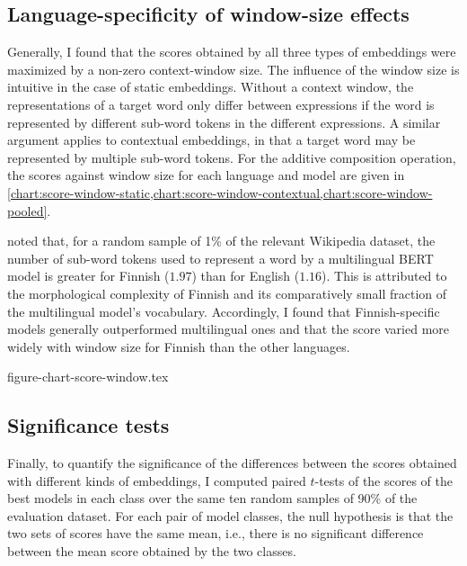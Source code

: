 \subsection{Language-specificity of window-size effects}
\label{sec:language-specificity}

Generally, I found that the scores obtained by all three types of embeddings were
maximized by a non-zero context-window size.
The influence of the window size is intuitive in the case of static embeddings.
Without a context window, the representations of a target word only differ between
expressions if the word is represented by different sub-word tokens in the different
expressions.
A similar argument applies to contextual embeddings, in that a target word may be
represented by multiple sub-word tokens.
For the additive composition operation, the scores against window size for each
language and model are given in
\cref{chart:score-window-static,chart:score-window-contextual,chart:score-window-pooled}.

\textcite[3]{Virtanen2019} noted that, for a random sample of 1\% of the relevant
Wikipedia dataset, the number of sub-word tokens used to represent a word by a
multilingual BERT model is greater for Finnish ($1.97$) than for English ($1.16$).
This is attributed to the morphological complexity of Finnish and its comparatively
small fraction of the multilingual model's vocabulary.
Accordingly, I found that Finnish-specific models generally outperformed multilingual
ones and that the score varied more widely with window size for Finnish than the other
languages.

{figure-chart-score-window.tex}

\subsection{Significance tests}

Finally, to quantify the significance of the differences between the scores obtained
with different kinds of embeddings, I computed paired $t$-tests of the scores of the
best models in each class over the same ten random samples of 90\% of the evaluation
dataset.
For each pair of model classes, the null hypothesis is that the two sets of scores have
the same mean, i.e., there is no significant difference between the mean score obtained
by the two classes.
\\
